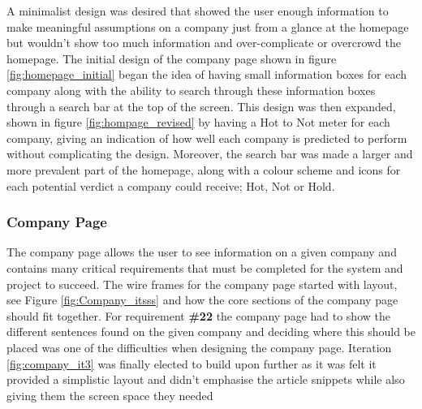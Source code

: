         A minimalist design was desired that showed the user enough information to make meaningful assumptions on a company just from a glance at the homepage but wouldn't show too much information and over-complicate or overcrowd the homepage. The initial design of the company page shown in figure \ref{fig:homepage_initial} began the idea of having small information boxes for each company along with the ability to search through these information boxes through a search bar at the top of the screen. This design was then expanded, shown in figure \ref{fig:hompage_revised} by having a Hot to Not meter for each company, giving an indication of how well each company is predicted to perform without complicating the design. Moreover, the search bar was made a larger and more prevalent part of the homepage, along with a colour scheme and icons for each potential verdict a company could receive; Hot, Not or Hold. 
        
        \subsubsection{Company Page}
        The company page allows the user to see information on a given company and contains many critical requirements that must be completed for the system and project to succeed. The wire frames for the company page started with layout, see Figure \ref{fig:Company_itsss} and how the core sections of the company page should fit together. For requirement \textbf{\#22} the company page had to show the different sentences found on the given company and deciding where this should be placed was one of the difficulties when designing the company page. Iteration \ref{fig:company_it3} was finally elected to build upon further as it was felt it provided a simplistic layout and didn't emphasise the article snippets while also giving them the screen space they needed
          
